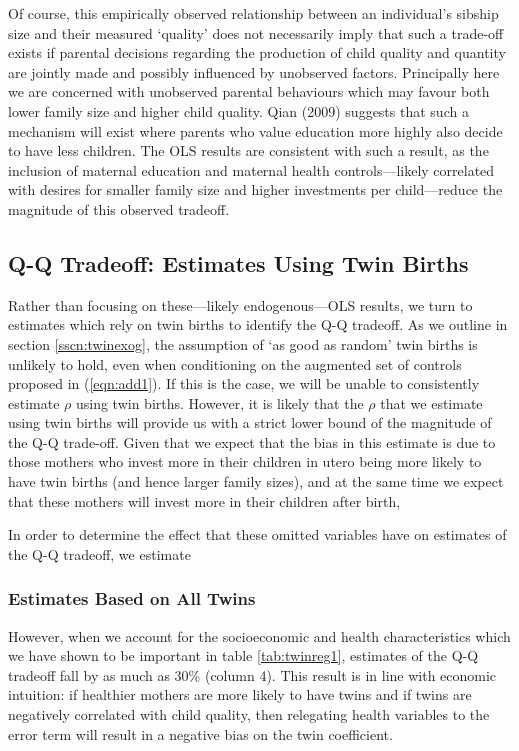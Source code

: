 \documentclass{article}[12pt,subeqn]
\begin{document}
\begin{spacing}{1.5}
Of course, this empirically observed relationship between an individual’s sibship size and their measured ‘quality’ does not necessarily imply that such a trade-off exists if parental decisions regarding the production of child quality and quantity are jointly made and possibly influenced by unobserved factors.  Principally here we are concerned with unobserved parental behaviours which may favour both lower family size and higher child quality. Qian (2009) suggests that such a mechanism will exist where parents who value education more highly also decide to have less children.  The OLS results are consistent with such a result, as the inclusion of maternal education and maternal health controls---likely correlated with desires for smaller family size and higher investments per child---reduce the magnitude of this observed tradeoff.

\subsection{Q-Q Tradeoff: Estimates Using Twin Births}
Rather than focusing on these---likely endogenous---OLS results, we turn to estimates which rely on twin births to identify the Q-Q tradeoff.  As we outline in section \ref{sscn:twinexog}, the assumption of `as good as random' twin births is unlikely to hold, even when conditioning on the augmented set of controls proposed in (\ref{eqn:add1}).  If this is the case, we will be unable to consistently estimate $\rho$ using twin births.  However, it is likely that the $\rho$ that we estimate using twin births will provide us with a strict lower bound of the magnitude of the Q-Q trade-off.  Given that we expect that the bias in this estimate is due to those mothers who invest more in their children in utero being more likely to have twin births (and hence larger family sizes), and at the same time we expect that these mothers will invest more in their children after birth, 

In order to determine the effect that these omitted variables have on estimates of the Q-Q tradeoff, we estimate 

\subsubsection{Estimates Based on All Twins}

However, when we account for the socioeconomic and health characteristics which we have shown to be important in table \ref{tab:twinreg1}, estimates of the Q-Q tradeoff fall by as much as 30\% (column 4). This result is in line with economic intuition: if healthier mothers are more likely to have twins and if twins are negatively correlated with child quality, then relegating health variables to the error term will result in a negative bias on the twin coefficient.




\end{spacing}
\end{document}

